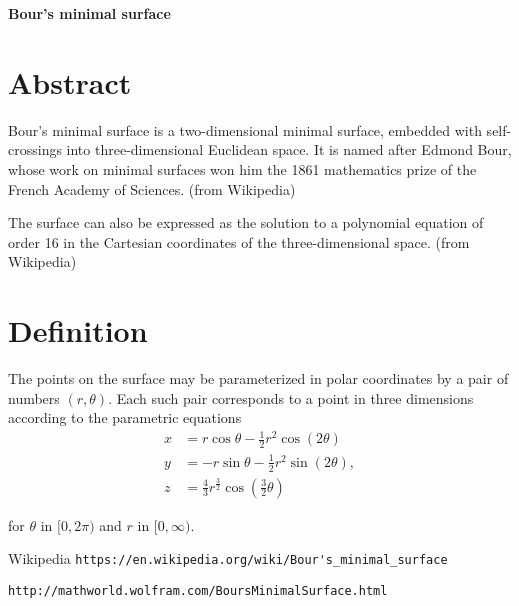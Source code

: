 \documentclass[12pt,dvipdfmx]{article}
\begin{document}
\begin{center}

{\bf \Large Bour's minimal surface}

\end{center}


\section{Abstract}

 Bour's minimal surface is a two-dimensional minimal surface, embedded with self-crossings into three-dimensional Euclidean space. It is named after Edmond Bour, whose work on minimal surfaces won him the 1861 mathematics prize of the French Academy of Sciences. (from Wikipedia)

The surface can also be expressed as the solution to a polynomial equation of order 16 in the Cartesian coordinates of the three-dimensional space. (from Wikipedia)



\section{Definition}
The points on the surface may be parameterized in polar coordinates by a pair of numbers $(r,\theta)$. Each such pair corresponds to a point in three dimensions according to the parametric equations
\begin{align*}
x&=	r \cos \theta-\frac{1}{2} r^2 \cos(2\theta)	
\\
y &=	-r \sin\theta-\frac{1}{2} r^2 \sin(2\theta),	
\\
z&=	\frac43 r^{\frac{3}{2}} \cos(\frac32 \theta) 	
\end{align*}

for $\theta$ in $[0,2\pi)$ and $r$ in $[0, \infty)$.


\begin{thebibliography}{9}

 Wikipedia \verb|https://en.wikipedia.org/wiki/Bour's_minimal_surface|

 \verb|http://mathworld.wolfram.com/BoursMinimalSurface.html|


\end{thebibliography}
\end{document}

